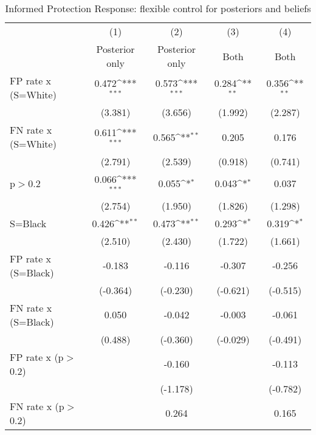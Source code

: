 \begin{table}[htbp]\centering
\def\sym#1{\ifmmode^{#1}\else\(^{#1}\)\fi}
\caption{Informed Protection Response: flexible control for posteriors and beliefs}
\begin{tabular}{l*{4}{c}}
\hline\hline
                &\multicolumn{1}{c}{(1)}&\multicolumn{1}{c}{(2)}&\multicolumn{1}{c}{(3)}&\multicolumn{1}{c}{(4)}\\
                &\multicolumn{1}{c}{Posterior only}&\multicolumn{1}{c}{Posterior only}&\multicolumn{1}{c}{Both}&\multicolumn{1}{c}{Both}\\
\hline
FP rate x (S=White)&    0.472\sym{***}&    0.573\sym{***}&    0.284\sym{**} &    0.356\sym{**} \\
                &  (3.381)         &  (3.656)         &  (1.992)         &  (2.287)         \\
FN rate x (S=White)&    0.611\sym{***}&    0.565\sym{**} &    0.205         &    0.176         \\
                &  (2.791)         &  (2.539)         &  (0.918)         &  (0.741)         \\
p$>$0.2         &    0.066\sym{***}&    0.055\sym{*}  &    0.043\sym{*}  &    0.037         \\
                &  (2.754)         &  (1.950)         &  (1.826)         &  (1.298)         \\
S=Black         &    0.426\sym{**} &    0.473\sym{**} &    0.293\sym{*}  &    0.319\sym{*}  \\
                &  (2.510)         &  (2.430)         &  (1.722)         &  (1.661)         \\
FP rate x (S=Black)&   -0.183         &   -0.116         &   -0.307         &   -0.256         \\
                & (-0.364)         & (-0.230)         & (-0.621)         & (-0.515)         \\
FN rate x (S=Black)&    0.050         &   -0.042         &   -0.003         &   -0.061         \\
                &  (0.488)         & (-0.360)         & (-0.029)         & (-0.491)         \\
FP rate x (p$>$0.2)&                  &   -0.160         &                  &   -0.113         \\
                &                  & (-1.178)         &                  & (-0.782)         \\
FN rate x (p$>$0.2)&                  &    0.264         &                  &    0.165         \\

\end{tabular}
\end{table}
